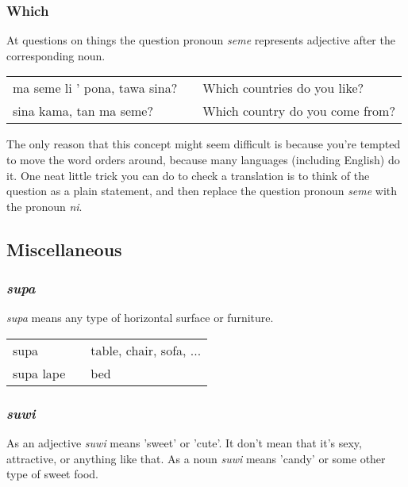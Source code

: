 \subsubsection*{Which}
%
%
At questions on things the question pronoun \textit{seme} represents adjective after the corresponding noun. 

\begin{supertabular}{p{5,5cm}|ll}
ma seme li ' pona, tawa sina? && Which countries do you like? \\
sina kama, tan ma seme? && Which country do you come from? \\ 
\end{supertabular} 

The only reason that this concept might seem difficult is because you're tempted to move the word orders around, because many languages (including English) do it. 
One neat little trick you can do to check a translation is to think of the question as a plain statement, and then replace the question pronoun \textit{seme} with the pronoun \textit{ni}. 
%
%
\newpage
\subsection*{Miscellaneous}
%
\subsubsection*{\textit{supa}}
%
%
\textit{supa} means any type of horizontal surface or furniture. 

\begin{supertabular}{p{5,5cm}|ll}
supa  && table, chair, sofa, ...  \\
supa lape &&  bed \\
\end{supertabular} 

%
\subsubsection*{\textit{suwi}}
%
%
As an adjective \textit{suwi} means 'sweet' or 'cute'.
It don't mean that it's sexy, attractive, or anything like that. 
As a noun \textit{suwi} means  'candy' or some other type of sweet food. 

